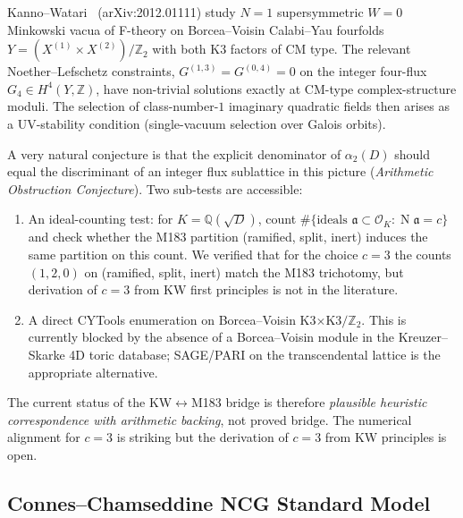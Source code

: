 \documentclass[12pt]{amsart}
\theoremstyle{definition}
\DeclareMathOperator{\Nm}{N}
\newcommand{\Q}{\mathbb{Q}}
\newcommand{\Z}{\mathbb{Z}}
\newcommand{\OK}{\mathcal{O}_K}
\begin{document}
Kanno--Watari~\cite{KannoWatari2020} (arXiv:2012.01111) study
$N = 1$ supersymmetric $W = 0$ Minkowski vacua of F-theory on
Borcea--Voisin Calabi--Yau fourfolds $Y = (X^{(1)} \times X^{(2)})/\Z_2$
with both K3 factors of CM type. The relevant Noether--Lefschetz
constraints, $G^{(1,3)} = G^{(0,4)} = 0$ on the integer four-flux
$G_4 \in H^4(Y, \Z)$, have non-trivial solutions exactly at
CM-type complex-structure moduli. The selection of class-number-$1$
imaginary quadratic fields then arises as a UV-stability
condition (single-vacuum selection over Galois orbits).

A very natural conjecture is that the explicit denominator of
$\alpha_2(D)$ should equal the discriminant of an integer flux
sublattice in this picture (\emph{Arithmetic Obstruction
Conjecture}). Two sub-tests are accessible:
\begin{enumerate}[leftmargin=2em]
  \item An ideal-counting test: for $K = \Q(\sqrt{D})$, count
        $\#\{\text{ideals } \mathfrak{a} \subset \OK : \Nm \mathfrak{a} = c\}$
        and check whether the M183 partition (ramified, split, inert)
        induces the same partition on this count. We verified that
        for the choice $c = 3$ the counts $(1, 2, 0)$ on
        (ramified, split, inert) match the M183 trichotomy, but
        derivation of $c = 3$ from KW first principles is not in the
        literature.
  \item A direct CYTools enumeration on Borcea--Voisin K3$\times$K3$/\Z_2$.
        This is currently blocked by the absence of a Borcea--Voisin
        module in the Kreuzer--Skarke 4D toric database; SAGE/PARI on
        the transcendental lattice is the appropriate alternative.
\end{enumerate}
The current status of the KW$\leftrightarrow$M183 bridge is therefore
\emph{plausible heuristic correspondence with arithmetic backing}, not
proved bridge. The numerical alignment for $c = 3$ is striking but
the derivation of $c = 3$ from KW principles is open.

\subsection{Connes--Chamseddine NCG Standard Model}
\end{document}
